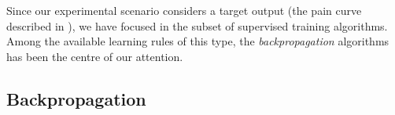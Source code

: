
\label{sec:generalbackprop}



Since our experimental scenario considers a target output (the pain curve described in ), we have focused in the subset of supervised training algorithms. 
Among the available learning rules of this type, the \emph{backpropagation} algorithms has been the centre of our attention. 

\subsection{Backpropagation}

